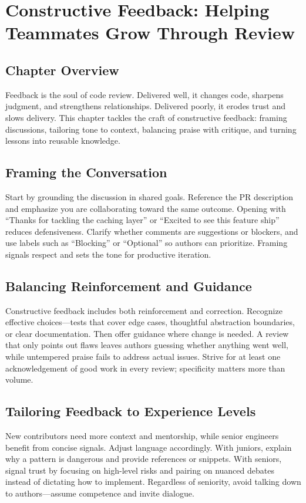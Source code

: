 \chapter{Constructive Feedback: Helping Teammates Grow Through Review}

\section{Chapter Overview}
Feedback is the soul of code review. Delivered well, it changes code, sharpens judgment, and strengthens relationships. Delivered poorly, it erodes trust and slows delivery. This chapter tackles the craft of constructive feedback: framing discussions, tailoring tone to context, balancing praise with critique, and turning lessons into reusable knowledge.

\section{Framing the Conversation}
Start by grounding the discussion in shared goals. Reference the PR description and emphasize you are collaborating toward the same outcome. Opening with ``Thanks for tackling the caching layer'' or ``Excited to see this feature ship'' reduces defensiveness. Clarify whether comments are suggestions or blockers, and use labels such as ``Blocking'' or ``Optional'' so authors can prioritize. Framing signals respect and sets the tone for productive iteration.

\section{Balancing Reinforcement and Guidance}
Constructive feedback includes both reinforcement and correction. Recognize effective choices---tests that cover edge cases, thoughtful abstraction boundaries, or clear documentation. Then offer guidance where change is needed. A review that only points out flaws leaves authors guessing whether anything went well, while untempered praise fails to address actual issues. Strive for at least one acknowledgement of good work in every review; specificity matters more than volume.

\section{Tailoring Feedback to Experience Levels}
New contributors need more context and mentorship, while senior engineers benefit from concise signals. Adjust language accordingly. With juniors, explain why a pattern is dangerous and provide references or snippets. With seniors, signal trust by focusing on high-level risks and pairing on nuanced debates instead of dictating how to implement. Regardless of seniority, avoid talking down to authors---assume competence and invite dialogue.

